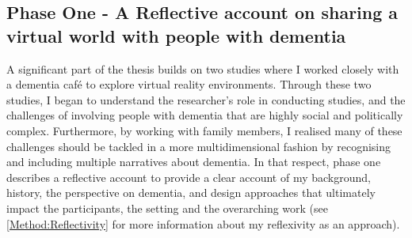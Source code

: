 \subsection{Phase One - A Reflective account on sharing a virtual world with people with dementia}

A significant part of the thesis builds on two studies where I worked closely with a dementia café to explore virtual reality environments. Through these two studies, I began to understand the researcher's role in conducting studies, and the challenges of involving people with dementia that are highly social and politically complex. Furthermore, by working with family members, I realised many of these challenges should be tackled in a more multidimensional fashion by recognising and including multiple narratives about dementia. In that respect, phase one describes a reflective account to provide a clear account of my background, history, the perspective on dementia, and design approaches that ultimately impact the participants, the setting and the overarching work (see \ref{Method:Reflectivity} for more information about my reflexivity as an approach).

